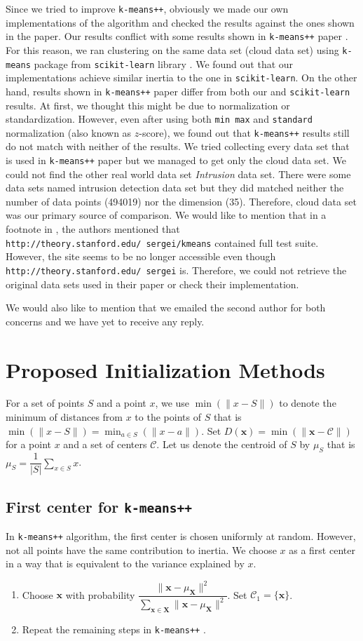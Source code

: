 \documentclass[twoside, 11pt]{article}
\newcommand{\x}{\mathbf{x}}
\newcommand{\X}{\mathbf{X}}
\newcommand{\C}{\mathcal{C}}
\begin{document}
	Since we tried to improve \texttt{k-means++}, obviously we made our own implementations of the algorithm and checked the results against the ones shown in the paper. Our results conflict with some results shown in \texttt{k-means++} paper \cite{kmeans++}. For this reason, we ran clustering on the same data set (cloud data set) using \texttt{k-means} package from \texttt{scikit-learn} library \citep{sklearn}. We found out that our implementations achieve similar inertia to the one in \texttt{scikit-learn}. On the other hand, results shown in \texttt{k-means++} paper differ from both our and \texttt{scikit-learn} results. At first, we thought this might be due to normalization or standardization. However, even after using both \texttt{min max} and \texttt{standard} normalization (also known as $z$-score), we found out that \texttt{k-means++} results still do not match with neither of the results. We tried collecting every data set that is used in \texttt{k-means++} paper but we managed to get only the cloud data set. We could not find the other real world data set \textit{Intrusion} data set. There were some data sets named intrusion detection data set but they did matched neither the number of data points (494019) nor the dimension (35). Therefore, cloud data set was our primary source of comparison. We would like to mention that in a footnote in \cite[Section $6$, page $8$]{kmeans++}, the authors mentioned that \texttt{http://theory.stanford.edu/~sergei/kmeans} contained full test suite. However, the site seems to be no longer accessible even though \texttt{http://theory.stanford.edu/~sergei} is. Therefore, we could not retrieve the original data sets used in their paper or check their implementation.
	
	We would also like to mention that we emailed the second author for both concerns and we have yet to receive any reply.
	\section{Proposed Initialization Methods}
	For a set of points $S$ and a point $x$, we use $\min(\|x-S\|)$ to denote the minimum of distances from $x$ to the points of $S$ that is $\min(\| x-S\|)=\min_{a\in S}(\| x-a\|)$. Set $D(\x)=\min(\|\x-\C\|)$ for a point $x$ and a set of centers $\C$. Let us denote the centroid of $S$ by $\mu_S$ that is $\mu_S=\dfrac{1}{|S|}\sum_{x\in S}x$.
	\subsection{First center for \texttt{k-means++}}\label{sec:first_center}
	In \texttt{k-means++} algorithm, the first center is chosen uniformly at random. However, not all points have the same contribution to inertia. We choose $x$ as a first center in a way that is equivalent to the variance explained by $x$.
	\begin{enumerate}[i]
		\item Choose $\x$ with probability $\dfrac{\|\x-\mu_{\X}\|^2}{\sum_{\x\in\X}\|\x-\mu_{\X}\|^2}$. Set $\C_1=\{\x\}$.\label{step:first_center}
		\item Repeat the remaining steps in \texttt{k-means++} \cite[Section $2.2$, Page $3$]{kmeans++}.
	\end{enumerate}
\end{document}
